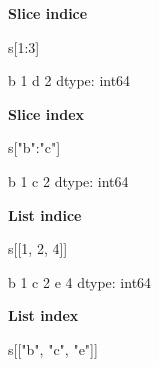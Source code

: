 \documentclass[
]{book}
\newenvironment{Shaded}{\begin{snugshade}}{\end{snugshade}}
\newcommand{\DecValTok}[1]{\textcolor[rgb]{0.00,0.00,0.81}{#1}}
\newcommand{\NormalTok}[1]{#1}
\newcommand{\StringTok}[1]{\textcolor[rgb]{0.31,0.60,0.02}{#1}}
\begin{document}
\textbf{Slice indice}

\begin{Shaded}
\begin{Highlighting}[]
\NormalTok{s[}\DecValTok{1}\NormalTok{:}\DecValTok{3}\NormalTok{]}
\end{Highlighting}
\end{Shaded}

\begin{Shaded}
\begin{Highlighting}[]
\NormalTok{b    1}
\NormalTok{d    2}
\NormalTok{dtype: int64}
\end{Highlighting}
\end{Shaded}

\textbf{Slice index}

\begin{Shaded}
\begin{Highlighting}[]
\NormalTok{s[}\StringTok{"b"}\NormalTok{:}\StringTok{"c"}\NormalTok{]}
\end{Highlighting}
\end{Shaded}

\begin{Shaded}
\begin{Highlighting}[]
\NormalTok{b    1}
\NormalTok{c    2}
\NormalTok{dtype: int64}
\end{Highlighting}
\end{Shaded}

\textbf{List indice}

\begin{Shaded}
\begin{Highlighting}[]
\NormalTok{s[[}\DecValTok{1}\NormalTok{, }\DecValTok{2}\NormalTok{, }\DecValTok{4}\NormalTok{]]}
\end{Highlighting}
\end{Shaded}

\begin{Shaded}
\begin{Highlighting}[]
\NormalTok{b    1}
\NormalTok{c    2}
\NormalTok{e    4}
\NormalTok{dtype: int64}
\end{Highlighting}
\end{Shaded}

\textbf{List index}

\begin{Shaded}
\begin{Highlighting}[]
\NormalTok{s[[}\StringTok{"b"}\NormalTok{, }\StringTok{"c"}\NormalTok{, }\StringTok{"e"}\NormalTok{]]}
\end{Highlighting}
\end{Shaded}
\end{document}
